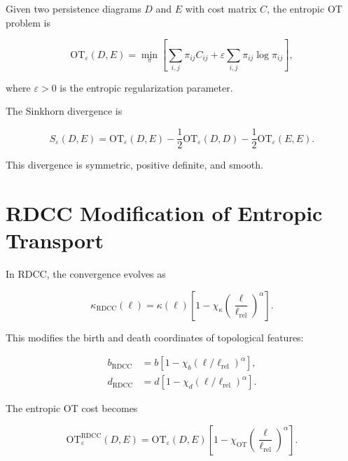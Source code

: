 \documentclass[11pt,a4paper]{article}
\begin{document}
Given two persistence diagrams $D$ and $E$ with cost matrix $C$, the entropic OT 
problem is

\begin{equation}
    \mathrm{OT}_{\varepsilon}(D,E)
    = \min_{\pi}
      \left[
        \sum_{i,j} \pi_{ij} C_{ij}
        + \varepsilon \sum_{i,j} \pi_{ij} \log \pi_{ij}
      \right],
\end{equation}

where $\varepsilon > 0$ is the entropic regularization parameter.

The Sinkhorn divergence is

\begin{equation}
    S_{\varepsilon}(D,E)
    = \mathrm{OT}_{\varepsilon}(D,E)
    - \frac{1}{2}
      \mathrm{OT}_{\varepsilon}(D,D)
    - \frac{1}{2}
      \mathrm{OT}_{\varepsilon}(E,E).
\end{equation}

This divergence is symmetric, positive definite, and smooth.
\section{RDCC Modification of Entropic Transport}

In RDCC, the convergence evolves as

\begin{equation}
    \kappa_{\mathrm{RDCC}}(\ell)
    = \kappa(\ell)
      \left[
        1 - \chi_{\kappa}
        \left(\frac{\ell}{\ell_{\mathrm{rel}}}\right)^{\alpha}
      \right].
\end{equation}

This modifies the birth and death coordinates of topological features:

\begin{align}
    b_{\mathrm{RDCC}} &= b \left[ 1 - \chi_{b} (\ell/\ell_{\mathrm{rel}})^{\alpha} \right], \\
    d_{\mathrm{RDCC}} &= d \left[ 1 - \chi_{d} (\ell/\ell_{\mathrm{rel}})^{\alpha} \right].
\end{align}

The entropic OT cost becomes

\begin{equation}
    \mathrm{OT}^{\mathrm{RDCC}}_{\varepsilon}(D,E)
    = \mathrm{OT}_{\varepsilon}(D,E)
      \left[
        1 - \chi_{\mathrm{OT}}
        \left(\frac{\ell}{\ell_{\mathrm{rel}}}\right)^{\alpha}
      \right].
\end{equation}
\end{document}
